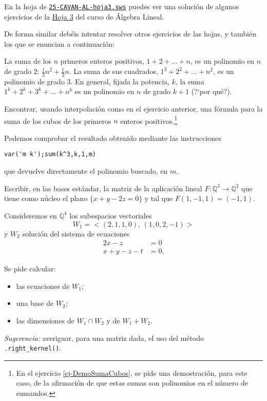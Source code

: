 \par
\medskip
\par

En la hoja de {\sage}
\href{http://sage.mat.uam.es:8888/home/pub/24/}{\tt 25-CAVAN-AL-hoja3.sws}
puedes ver una soluci\'on de algunos ejercicios de la 
 \href{http://150.244.21.37/PDFs/CAVAN/AL1213-hoja3.pdf}{Hoja 3} del curso de \'Algebra Lineal. 

 De forma similar deb\'eis intentar resolver otros ejercicios de las hojas, y
tambi\'en los que se enuncian a continuaci\'on:

\begin{ejer}\label{ej-SumaCubos}
La suma de los $n$ primeros enteros positivos, $1+2+\dots+n$, es un polinomio en
$n$
de grado
$2$: $\frac12n^2+\frac12n$. La suma de sus cuadrados, $1^2+2^2+\dots+n^2$, es un
polinomio de grado $3$. En general, fijada la potencia, $k$, la suma
$1^k+2^k+3^k+\dots+n^k$ es un polinomio en $n$ de grado $k+1$ ({\sc ?`por
qu\'e?}).

Encontrar, usando interpolaci\'on como en el ejercicio anterior,   una fórmula
para la suma de los cubos de los primeros $n$ enteros
positivos.\footnote{En el ejercicio \ref{ej-DemoSumaCubos}, se pide
una demostración, para este caso, de la afirmaci\'on de que estas sumas son
polinomios en
el n\'umero de sumandos.}

Podemos comprobar el resultado obtenido mediante las instrucciones
\begin{center}
\lstinline|var('m k');sum(k^3,k,1,m)| 
\end{center}
que devuelve directamente el polinomio
buscado, en $m$.
\end{ejer}

\begin{ejer}
Escribir, en las bases estándar, la matriz de la aplicación lineal 
$F:\mathbb{Q}^3\longrightarrow \mathbb{Q}^2$ que tiene como n\'ucleo el plano
$\{x+y-2z=0\}$ y
tal que
$F(1,-1,1)=(-1,1)$.
\end{ejer}

\pagebreak[3]

\begin{ejer}
 Consideremos en $\mathbb{Q}^4$ los  subespacios vectoriales
\[W_1=<(2,1,1,0),\,(1,0,2,-1)>\] y   $W_2$ soluci\'on del sistema de ecuaciones
\[
\begin{aligned}
2x-z&=0\\
x+y-z-t&=0.
\end{aligned}
\]



Se pide calcular:
\begin{itemize}
\item las ecuaciones de $W_1$;
\item una base de $W_2$;
\item las dimensiones de $W_1\cap W_2$ y de $W_1+W_2$.
\end{itemize}
\emph{Sugerencia: } averiguar, para una matriz dada, el uso del m\'etodo
\lstinline|.right_kernel()|.
\end{ejer}


